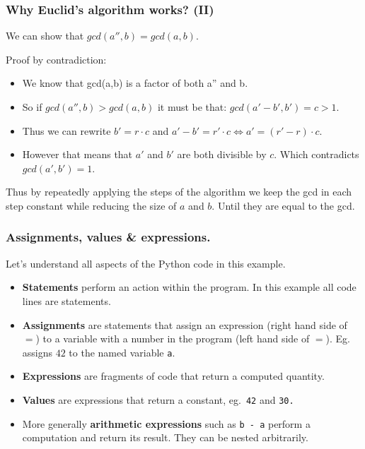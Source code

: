 \documentclass{beamer} %
\newcommand\emc[1]{\textcolor{brightblue}{\textbf{#1}}}
\begin{document}
\begin{frame}
\frametitle{Why Euclid's algorithm works? (II)}

We can show that $gcd(a'', b) = gcd(a,b)$.

Proof by contradiction: 

\begin{itemize}
\item We know that gcd(a,b) is a factor of both a'' and b. 
\item So if $gcd(a'', b) > gcd(a,b)$ it must be that:
$gcd(a' - b', b') = c > 1$. 
\item Thus we can rewrite $b' = r \cdot c$ and $a' - b' = r' \cdot c \Leftrightarrow a' = (r' - r) \cdot c $. 
\item However that means that $a'$ and $b'$ are both divisible by $c$. Which contradicts $gcd(a',b') = 1$.
\end{itemize}

Thus by repeatedly applying the steps of the algorithm we keep the gcd in each step constant while reducing the size of $a$ and $b$. Until they are equal to the gcd.

\end{frame}




\begin{frame}
\frametitle{Assignments, values \& expressions.}

Let's understand all aspects of the Python code in this example.
\begin{itemize}
\item \emc{Statements} perform an action within the program. In this example all code lines are statements.
\item \emc{Assignments} are statements that assign an expression (right hand side of $=$) to a variable with a number in the program (left hand side of $=$). 
Eg.\  assigns $42$ to the named variable \texttt{a}.
\item \emc{Expressions} are fragments of code that return a computed quantity.
\item \emc{Values} are expressions that return a constant, eg.\ \texttt{42} and \texttt{30.}
\item More generally \emc{arithmetic expressions} such as \texttt{b - a} perform a computation and return its result. They can be nested arbitrarily.
\end{itemize}

\end{frame}
\end{document}
